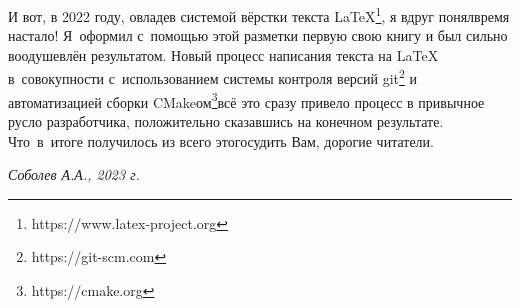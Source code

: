 {\renewcommand*{\thefootnote}{\arabic{footnote}}
И вот, в 2022 году, овладев системой вёрстки текста \LaTeX{}\footnote[1]{https://www.latex-project.org}, я вдруг понял\mdash время настало! Я~оформил с~помощью этой разметки первую свою книгу и был сильно воодушевлён результатом. Новый процесс написания текста на \LaTeX{} в~совокупности с~использованием системы контроля версий git\footnote[2]{https://git-scm.com} и автоматизацией сборки CMake\sdash ом\footnote[3]{https://cmake.org}\mdash всё это сразу привело процесс в привычное русло разработчика, положительно сказавшись на конечном результате. Что~в~итоге получилось из всего этого\mdash судить Вам, дорогие читатели.

\begin{flushright}
	\textit{Соболев А.А., 2023 г.}
\end{flushright}

}
\fancyhead[LE]{\fancyplain{}{\bfseries \parttitle}}
\fancyhead[RO]{\fancyplain{}{\bfseries \rightmark}}